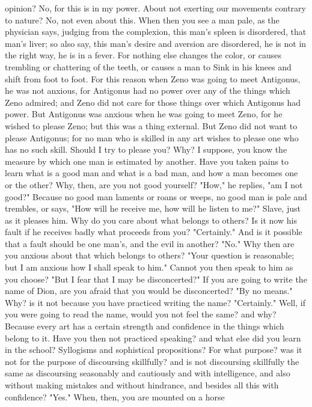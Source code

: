 \documentclass[a4paper]{article}
\begin{document}
opinion? No, for this is in my power. About not exerting our movements contrary
to nature? No, not even about this. When then you see a man pale, as the
physician says, judging from the complexion, this man's spleen is disordered,
that man's liver; so also say, this man's desire and aversion are disordered,
he is not in the right way, he is in a fever. For nothing else changes the
color, or causes trembling or chattering of the teeth, or causes a man to
       Sink in his knees and shift from foot to foot.
    For this reason when Zeno was going to meet Antigonus, he was not anxious,
for Antigonus had no power over any of the things which Zeno admired; and Zeno
did not care for those things over which Antigonus had power. But Antigonus was
anxious when he was going to meet Zeno, for he wished to please Zeno; but this
was a thing external. But Zeno did not want to please Antigonus; for no man who
is skilled in any art wishes to please one who has no such skill.
    Should I try to please you? Why? I suppose, you know the measure by which
one man is estimated by another. Have you taken pains to learn what is a good
man and what is a bad man, and how a man becomes one or the other? Why, then,
are you not good yourself? "How," he replies, "am I not good?" Because no good
man laments or roans or weeps, no good man is pale and trembles, or says, "How
will he receive me, how will he listen to me?" Slave, just as it pleases him.
Why do you care about what belongs to others? Is it now his fault if he
receives badly what proceeds from you? "Certainly." And is it possible that a
fault should be one man's, and the evil in another? "No." Why then are you
anxious about that which belongs to others? "Your question is reasonable; but I
am anxious how I shall speak to him." Cannot you then speak to him as you
choose? "But I fear that I may be disconcerted?" If you are going to write the
name of Dion, are you afraid that you would be disconcerted? "By no means."
Why? is it not because you have practiced writing the name? "Certainly." Well,
if you were going to read the name, would you not feel the same? and why?
Because every art has a certain strength and confidence in the things which
belong to it. Have you then not practiced speaking? and what else did you learn
in the school? Syllogisms and sophistical propositions? For what purpose? was
it not for the purpose of discoursing skillfully? and is not discoursing
skillfully the same as discoursing seasonably and cautiously and with
intelligence, and also without making mistakes and without hindrance, and
besides all this with confidence? "Yes." When, then, you are mounted on a horse
\end{document}
